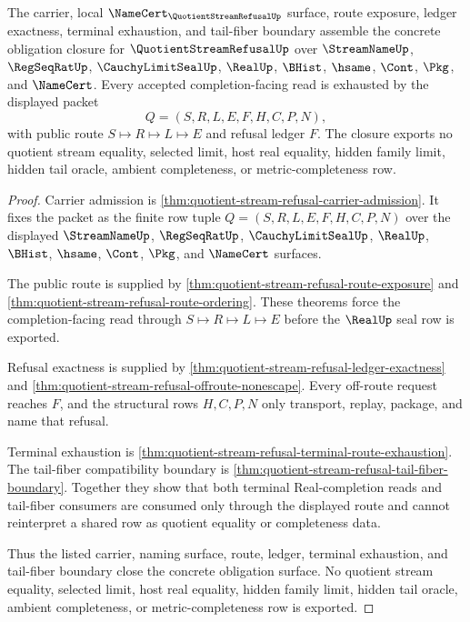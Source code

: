 \begin{theorem}
\label{thm:quotient-stream-refusal-obligation-closure}
The carrier, local $\NameCert_{\QuotientStreamRefusalUp}$ surface, route exposure, ledger exactness, terminal exhaustion, and tail-fiber boundary assemble the concrete obligation closure for $\QuotientStreamRefusalUp$ over $\StreamNameUp$, $\RegSeqRatUp$, $\CauchyLimitSealUp$, $\RealUp$, $\BHist$, $\hsame$, $\Cont$, $\Pkg$, and $\NameCert$. Every accepted completion-facing read is exhausted by the displayed packet
$$
Q=(S,R,L,E,F,H,C,P,N),
$$
with public route $S \longmapsto R \longmapsto L \longmapsto E$ and refusal ledger $F$. The closure exports no quotient stream equality, selected limit, host real equality, hidden family limit, hidden tail oracle, ambient completeness, or metric-completeness row.
\end{theorem}
\begin{proof}
Carrier admission is \autoref{thm:quotient-stream-refusal-carrier-admission}. It fixes the packet as the finite row tuple $Q=(S,R,L,E,F,H,C,P,N)$ over the displayed $\StreamNameUp$, $\RegSeqRatUp$, $\CauchyLimitSealUp$, $\RealUp$, $\BHist$, $\hsame$, $\Cont$, $\Pkg$, and $\NameCert$ surfaces.

The public route is supplied by \autoref{thm:quotient-stream-refusal-route-exposure} and \autoref{thm:quotient-stream-refusal-route-ordering}. These theorems force the completion-facing read through $S \longmapsto R \longmapsto L \longmapsto E$ before the $\RealUp$ seal row is exported.

Refusal exactness is supplied by \autoref{thm:quotient-stream-refusal-ledger-exactness} and \autoref{thm:quotient-stream-refusal-offroute-nonescape}. Every off-route request reaches $F$, and the structural rows $H,C,P,N$ only transport, replay, package, and name that refusal.

Terminal exhaustion is \autoref{thm:quotient-stream-refusal-terminal-route-exhaustion}. The tail-fiber compatibility boundary is \autoref{thm:quotient-stream-refusal-tail-fiber-boundary}. Together they show that both terminal Real-completion reads and tail-fiber consumers are consumed only through the displayed route and cannot reinterpret a shared row as quotient equality or completeness data.

Thus the listed carrier, naming surface, route, ledger, terminal exhaustion, and tail-fiber boundary close the concrete obligation surface. No quotient stream equality, selected limit, host real equality, hidden family limit, hidden tail oracle, ambient completeness, or metric-completeness row is exported.
\end{proof}


